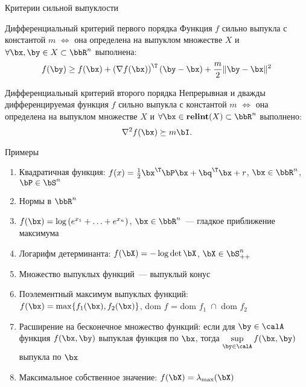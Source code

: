 \documentclass[12pt]{beamer}
\begin{document}
\begin{frame}{Критерии сильной выпуклости}

\begin{block}{Дифференциальный критерий первого порядка}
Функция $f$ сильно выпукла с константой $m$ $\Leftrightarrow$ она определена на выпуклом множестве $X$ и $\forall \bx, \by \in X \subset \bbR^n$ выполнена:
\vspace{-4mm}
\[
f(\by) \geq f(\bx) + \left( \nabla f(\bx) \right)^{\T} (\by - \bx) + \frac{m}{2}\| \by - \bx \|^2
\]
\end{block}

\begin{block}{Дифференциальный критерий второго порядка}
Непрерывная и дважды дифференцируемая функция $f$ сильно выпукла с константой $m$ $\Leftrightarrow$ она определена на выпуклом множестве $X$ и $\forall \bx \in \text{\bf relint}(X) \subset \bbR^n$ выполнено:
\vspace{-2mm}
\[
\nabla^2 f(\bx) \succeq m\bI.
\]
\end{block}
\end{frame}

\begin{frame}{Примеры}
\begin{enumerate}
\item Квадратичная функция: $f(x) = \frac{1}{2}\bx^{\T}\bP\bx + \bq^{\T}\bx + r$, $\bx \in \bbR^n$, $\bP \in \bS^n$
\item Нормы в $\bbR^n$
\item $f(\bx) = \log{(e^{x_1} + \ldots + e^{x_n})}$, $\bx \in \bbR^n$~--- гладкое приближение максимума
\item Логарифм детерминанта: $f(\bX) = -\log{\det{\bX}}$, $\bX \in \bS^n_{++}$
\item Множество выпуклых функций~--- выпуклый конус
\item Поэлементный максимум выпуклых функций: $f(\bx) = \max\{f_1(\bx), f_2(\bx)\}$, dom $f$ = dom $f_1 \; \cap $ dom $f_2$
\item Расширение на бесконечное множество функций: если для $\by \in \calA$ функция $f(\bx, \by)$ выпуклая функция по $\bx$, тогда $\sup\limits_{\by \in \calA} f(\bx, \by) $ выпукла по $\bx$
\item Максимальное собственное значение: $f(\bX) = \lambda_{\max}(\bX)$ 

\end{enumerate}
\end{frame}
\end{document}
